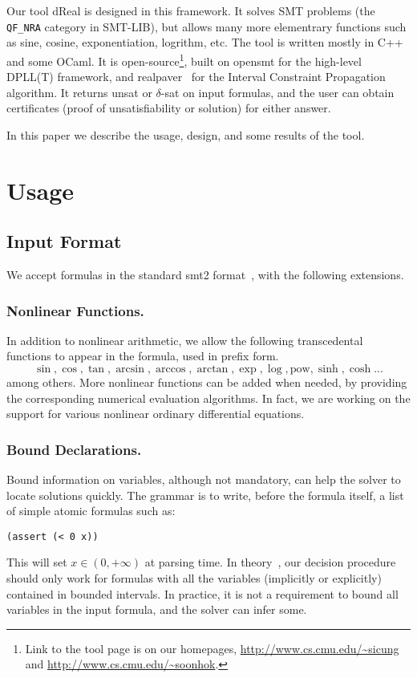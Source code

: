 \documentclass[envcountsect]{llncs}
\begin{document}
Our tool {\sf dReal} is designed in this framework. It solves SMT problems
(the {\tt QF\_NRA} category in SMT-LIB), but allows many more elementrary
functions such as sine, cosine, exponentiation, logrithm, etc. The tool is
written mostly in C++ and some OCaml. It is open-source\footnote{Link to the
tool page is on our homepages, \url{http://www.cs.cmu.edu/~sicung} and
\url{http://www.cs.cmu.edu/~soonhok}.
}, built on {\sf opensmt}\cite{} for the
high-level DPLL(T) framework, and {\sf realpaver}~\cite{} for the Interval
Constraint Propagation algorithm. It returns {\sf unsat} or {\sf $\delta$-sat}
on input formulas, and the user can obtain certificates (proof of
unsatisfiability or solution) for either answer.

In this paper we describe the usage, design, and some results of the tool.

\section{Usage}

\subsection{Input Format}

We accept formulas in the standard {\sf smt2} format~\cite{}, with the following
extensions.

\subsubsection{Nonlinear Functions.} In addition to nonlinear arithmetic, we
allow the following transcedental functions to appear in the formula, used in
prefix form.
 $$\sin, \cos, \tan, \arcsin, \arccos, \arctan, \exp, \log, \mbox{pow}, \sinh,
\cosh ... $$
among others. More nonlinear functions can be added when needed, by providing
the corresponding numerical evaluation algorithms. In fact, we are working on
the support for various nonlinear ordinary differential equations.

\subsubsection{Bound Declarations.} Bound information on variables, although not
mandatory, can help the solver to locate solutions quickly. The grammar is to
write, before the formula itself, a list of simple atomic formulas such as:
\begin{verbatim}
(assert (< 0 x))
\end{verbatim}
This will set $x\in (0, +\infty)$ at parsing time. In theory~\cite{}, our
decision procedure should only work for formulas with all the variables
(implicitly or explicitly) contained in bounded intervals. In practice, it is
not a requirement to bound all variables in the input formula, and the solver
can infer some.
\end{document}
